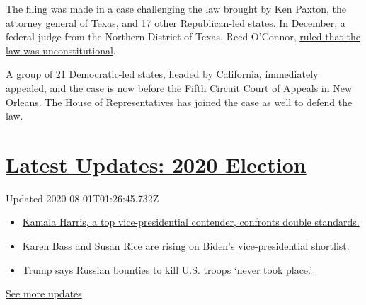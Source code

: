 The filing was made in a case challenging the law brought by Ken Paxton,
the attorney general of Texas, and 17 other Republican-led states. In
December, a federal judge from the Northern District of Texas, Reed
O'Connor,
\href{https://www.nytimes.com/2018/12/14/health/obamacare-unconstitutional-texas-judge.html?searchResultPosition=2}{ruled
that the law was unconstitutional}.

A group of 21 Democratic-led states, headed by California, immediately
appealed, and the case is now before the Fifth Circuit Court of Appeals
in New Orleans. The House of Representatives has joined the case as well
to defend the law.

\hypertarget{latest-updates-2020-election}{%
\section{\texorpdfstring{\href{https://www.nytimes.com/2020/07/31/us/elections/biden-vs-trump.html?action=click\&pgtype=Article\&state=default\&region=MAIN_CONTENT_1\&context=storylines_live_updates}{Latest
Updates: 2020
Election}}{Latest Updates: 2020 Election}}\label{latest-updates-2020-election}}

Updated 2020-08-01T01:26:45.732Z

\begin{itemize}
\tightlist
\item
  \href{https://www.nytimes.com/2020/07/31/us/elections/biden-vs-trump.html?action=click\&pgtype=Article\&state=default\&region=MAIN_CONTENT_1\&context=storylines_live_updates\#link-29fdff45}{Kamala
  Harris, a top vice-presidential contender, confronts double
  standards.}
\item
  \href{https://www.nytimes.com/2020/07/31/us/elections/biden-vs-trump.html?action=click\&pgtype=Article\&state=default\&region=MAIN_CONTENT_1\&context=storylines_live_updates\#link-13ec3d9c}{Karen
  Bass and Susan Rice are rising on Biden's vice-presidential
  shortlist.}
\item
  \href{https://www.nytimes.com/2020/07/31/us/elections/biden-vs-trump.html?action=click\&pgtype=Article\&state=default\&region=MAIN_CONTENT_1\&context=storylines_live_updates\#link-49e9a016}{Trump
  says Russian bounties to kill U.S. troops `never took place.'}
\end{itemize}

\href{https://www.nytimes.com/2020/07/31/us/elections/biden-vs-trump.html?action=click\&pgtype=Article\&state=default\&region=MAIN_CONTENT_1\&context=storylines_live_updates}{See
more updates}

